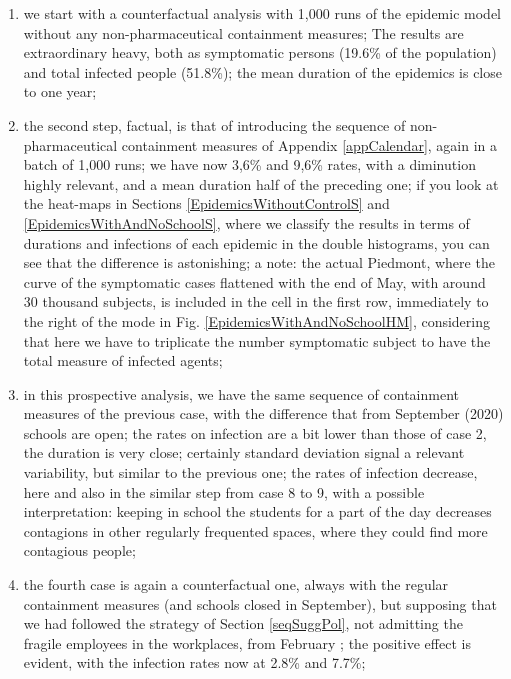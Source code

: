 \documentclass[graybox]{svmult}
\begin{document}
\begin{enumerate}
\setlength{\itemsep}{0pt}

\item\label{cf1} we start with a counterfactual analysis with 1,000 runs of the epidemic model without any non-pharmaceutical containment measures; The results are extraordinary heavy, both as symptomatic persons (19.6\% of the population) and total infected  people (51.8\%); the mean duration of the epidemics is close to one year;

\item\label{f1}  the second step, factual, is that of introducing the sequence of non-pharmaceutical containment measures of Appendix \ref{appCalendar}, again in a batch of 1,000 runs; we have now 3,6\% and 9,6\% rates, with a diminution highly relevant, and a mean duration half of the preceding one; if you look at the heat-maps in Sections \ref{EpidemicsWithoutControlS} and \ref{EpidemicsWithAndNoSchoolS}, where we classify the results in terms of durations and infections of each epidemic in the double histograms, you can see that the difference is astonishing; a note: the actual Piedmont, where the curve of the symptomatic cases flattened with the end of May, with around 30 thousand subjects, is included in the cell in the first row, immediately to the right of the mode in Fig. \ref{EpidemicsWithAndNoSchoolHM}, considering that here we have to triplicate the number symptomatic subject to have the total measure of infected agents;

\item\label{f2} in this prospective analysis, we have the same sequence of containment measures of the previous case, with the difference that from September  (2020) schools are open; the rates on infection are a bit lower than those of case 2, the duration is very close; certainly standard deviation signal a relevant variability, but similar to the previous one; the rates of infection decrease, here and also in the similar step from case 8 to 9, with a possible interpretation: keeping in school the students for a part of the day decreases contagions in other regularly frequented spaces, where they could find more contagious people;

\item\label{cf2} the fourth case is again a counterfactual one, always with the regular containment measures (and schools closed in September), but supposing that we had followed the strategy of Section \ref{seqSuggPol}, not admitting the fragile employees in the workplaces, from February ; the positive effect is evident, with the infection rates now at 2.8\% and 7.7\%;


\end{enumerate}
\end{document}
